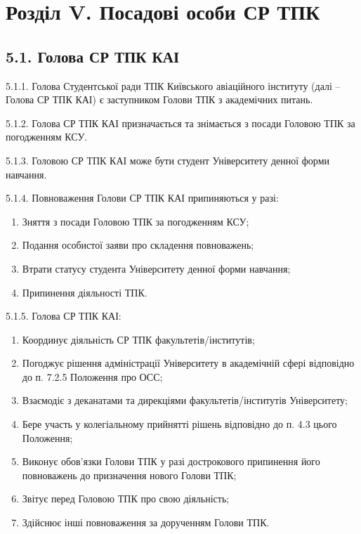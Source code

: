 \section*{Розділ V. Посадові особи СР ТПК}

\subsection*{5.1. Голова СР ТПК КАІ}
    5.1.1. Голова Студентської ради ТПК Київського авіаційного інституту (далі -- Голова СР ТПК КАІ) є заступником Голови ТПК з академічних питань.

    5.1.2. Голова СР ТПК КАІ призначається та знімається з посади Головою ТПК за погодженням КСУ.

    5.1.3. Головою СР ТПК КАІ може бути студент Університету денної форми навчання.

    5.1.4. Повноваження Голови СР ТПК КАІ припиняються у разі:

        \begin{enumerate}[label=\alph*)]
            \item Зняття з посади Головою ТПК за погодженням КСУ;
            \item Подання особистої заяви про складення повноважень;
            \item Втрати статусу студента Університету денної форми навчання;
            \item Припинення діяльності ТПК.
        \end{enumerate}

    5.1.5. Голова СР ТПК КАІ:

        \begin{enumerate}[label=\alph*)]
            \item Координує діяльність СР ТПК факультетів/інститутів;
            \item Погоджує рішення адміністрації Університету в академічній сфері відповідно до п. 7.2.5 Положення про ОСС;
            \item Взаємодіє з деканатами та дирекціями факультетів/інститутів Університету;
            \item Бере участь у колегіальному прийнятті рішень відповідно до п. 4.3 цього Положення;
            \item Виконує обов'язки Голови ТПК у разі дострокового припинення його повноважень до призначення нового Голови ТПК;
            \item Звітує перед Головою ТПК про свою діяльність;
            \item Здійснює інші повноваження за дорученням Голови ТПК.
        \end{enumerate}

